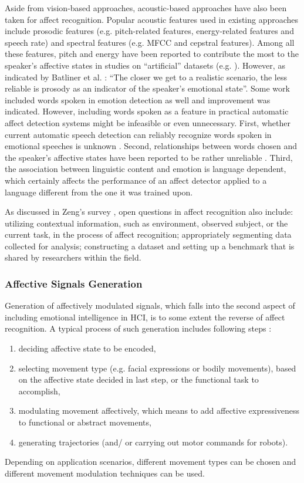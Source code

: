 Aside from vision-based approaches, acoustic-based approaches have also been taken for affect recognition. Popular acoustic features used in existing approaches include prosodic features (e.g. pitch-related features, energy-related features and speech rate) and spectral features (e.g. MFCC and cepstral features). Among all these features, pitch and energy have been reported to contribute the most to the speaker's affective states in studies on ``artificial'' datasets (e.g. \cite{kwon2003emotion}). However, as indicated by Batliner et al. \cite{batliner2003find}: ``The closer we get to a realistic scenario, the less reliable is prosody as an indicator of the speaker's emotional state''. Some work \cite{lee2005toward} included words spoken in emotion detection as well and improvement was indicated. However, including words spoken as a feature in practical automatic affect detection systems might be infeasible or even unnecessary. First, whether current automatic speech detection can reliably recognize words spoken in emotional speeches is unknown \cite{athanaselis2005asr}. Second, relationships between words chosen and the speaker's affective states have been reported to be rather unreliable \cite{ambady1992thin}. Third, the association between linguistic content and emotion is language dependent, which certainly affects the performance of an affect detector applied to a language different from the one it was trained upon.

As discussed in Zeng's survey \cite{zeng2009survey}, open questions in affect recognition also include: utilizing contextual information, such as environment, observed subject, or the current task, in the process of affect recognition; appropriately segmenting data collected for analysis; constructing a dataset and setting up a benchmark that is shared by researchers within the field.

\subsubsection{Affective Signals Generation}

Generation of affectively modulated signals, which falls into the second aspect of including emotional intelligence in HCI, is to some extent the reverse of affect recognition. A typical process of such generation includes following steps \cite{karg2013body}:
\begin{enumerate}
\item deciding affective state to be encoded,
\item selecting movement type (e.g. facial expressions or bodily movements), based on the affective state decided in last step, or the functional task to accomplish,
\item modulating movement affectively, which means to add affective expressiveness to functional or abstract movements,
\item generating trajectories (and/ or carrying out motor commands for robots).
\end{enumerate}
Depending on application scenarios, different movement types can be chosen and different movement modulation techniques can be used. 

